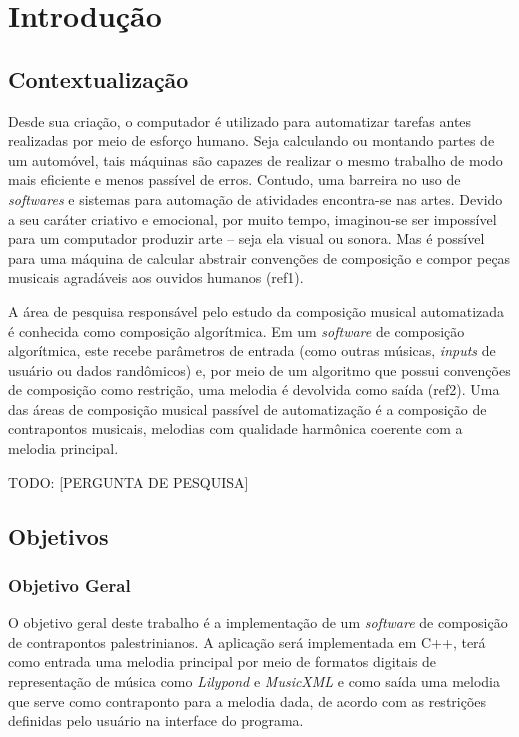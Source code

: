 \chapter*[Introdução]{Introdução}

  \section*{Contextualização}

  Desde sua criação, o computador é utilizado para automatizar tarefas antes realizadas por meio de esforço humano. Seja calculando ou montando partes de um automóvel, tais máquinas são capazes de realizar o mesmo trabalho de modo mais eficiente e menos passível de erros. Contudo, uma barreira no uso de \textit{softwares} e sistemas para automação de atividades encontra-se nas artes. Devido a seu caráter criativo e emocional, por muito tempo, imaginou-se ser impossível para um computador produzir arte -- seja ela visual ou sonora. Mas é possível para uma máquina de calcular abstrair convenções de composição e compor peças musicais agradáveis aos ouvidos humanos (ref1).

  A área de pesquisa responsável pelo estudo da composição musical automatizada é conhecida como composição algorítmica. Em um \textit{software} de composição algorítmica, este recebe parâmetros de entrada (como outras músicas, \textit{inputs} de usuário ou dados randômicos) e, por meio de um algoritmo que possui convenções de composição como restrição, uma melodia é devolvida como saída (ref2). Uma das áreas de composição musical passível de automatização é a composição de contrapontos musicais, melodias com qualidade harmônica coerente com a melodia principal.

  TODO: [PERGUNTA DE PESQUISA]

  \section*{Objetivos}

    \subsection*{Objetivo Geral}

      O objetivo geral deste trabalho é a implementação de um \textit{software} de composição de contrapontos palestrinianos. A aplicação será implementada em C++, terá como entrada uma melodia principal por meio de formatos digitais de representação de música como \textit{Lilypond} e \textit{MusicXML} e como saída uma melodia que serve como contraponto para a melodia dada, de acordo com as restrições definidas pelo usuário na interface do programa.

